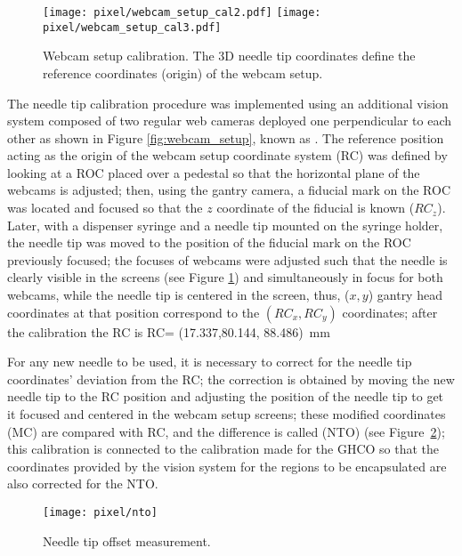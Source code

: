 \begin{figure}[h]
  \begin{center}
    \texttt{[image: pixel/webcam\_setup\_cal2.pdf]}
    \texttt{[image: pixel/webcam\_setup\_cal3.pdf]}\\
    \caption[Webcam setup calibration.]{Webcam setup calibration. The 3D needle tip coordinates define the reference coordinates (origin) of the webcam setup.}\label{fig:webcam_cal}
  \end{center}
\end{figure}

The needle tip calibration procedure was implemented using an additional vision system composed of two regular web cameras deployed one perpendicular to each other as shown in Figure \ref{fig:webcam_setup}, known as . The reference position acting as the origin of the webcam setup coordinate system (RC) was defined by looking at a ROC placed over a pedestal so that the horizontal plane of the webcams is adjusted; then, using the gantry camera, a fiducial mark on the ROC was located and focused so that the $z$ coordinate of the fiducial is known ($RC_z$). Later, with a dispenser syringe and a needle tip mounted on the syringe holder, the needle tip was moved to the position of the fiducial mark on the ROC previously focused; the focuses of webcams were adjusted such that the needle is clearly visible in the screens (see Figure \ref{fig:webcam_cal}) and simultaneously in focus for both webcams, while the needle tip is centered in the screen, thus, ($x,y$) gantry head coordinates at that position correspond to the $(RC_x, RC_y)$ coordinates; after the calibration the RC is
\beqn 
  RC= (17.337,80.144, 88.486)\ mm
\eeqn

For any new needle to be used, it is necessary to correct for the needle tip coordinates' deviation from the RC; the correction is obtained by moving the new needle tip to the RC position and adjusting the position of the needle tip to get it focused and centered in the webcam setup screens; these modified coordinates (MC) are compared with RC, and the difference is called  (NTO) (see Figure~\ref{fig:webcam_adjust}); this calibration is connected to the calibration made for the GHCO so that the coordinates provided by the vision system for the regions to be encapsulated are also corrected for the NTO.              
\begin{figure}[h]
  \centering
  \texttt{[image: pixel/nto]}
  \caption[Needle tip offset measurement.]{Needle tip offset measurement.}\label{fig:webcam_adjust}
\end{figure}

